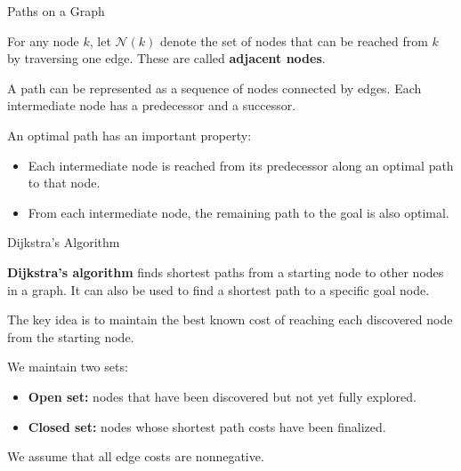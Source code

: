 \documentclass{beamer}
\begin{document}
\begin{frame}{Paths on a Graph}
	\begin{flushleft}
		
		For any node $k$, let $\mathcal{N}(k)$ denote
		the set of nodes that can be reached from $k$
		by traversing one edge. These are called
		\textbf{adjacent nodes}.
		
		\medskip
		
		A path can be represented as a sequence of nodes
		connected by edges. Each intermediate node has
		a predecessor and a successor.
		
		
		\medskip
		
		
		An optimal path has an important property:
		
		\begin{itemize}
			\item Each intermediate node is reached from
			its predecessor along an optimal path to that
			node.
			\item From each intermediate node, the remaining
			path to the goal is also optimal.
		\end{itemize}
		
		
	\end{flushleft}
\end{frame}

\begin{frame}{Dijkstra's Algorithm}
	\begin{flushleft}
		
		\textbf{Dijkstra's algorithm} finds shortest paths
		from a starting node to other nodes in a graph.
		It can also be used to find a shortest path to a
		specific goal node.
		
		
		\medskip
		The key idea is to maintain the best known
		cost of reaching each discovered node from
		the starting node.
		
		\medskip
		
		We maintain two sets:
		
		\begin{itemize}
			\item \textbf{Open set:} nodes that have been
			discovered but not yet fully explored.
			\item \textbf{Closed set:} nodes whose shortest
			path costs have been finalized.
		\end{itemize}
		
		We assume that all edge costs are nonnegative.
		
	\end{flushleft}
\end{frame}
\end{document}

